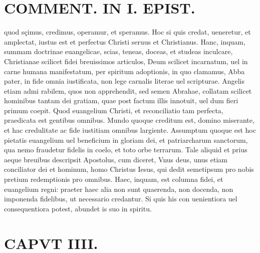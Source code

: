 \documentclass{article}
\begin{document}
\begin{pages}
\section*{COMMENT. IN I. EPIST. }
\marginpar{[ p.504 ]}\pstart quod sçimus, credimus, operamur, et speramus. Hoc si quis credat, ueneretur, et amplectat, iustus est et perfectus Christi seruus et Christianus. Hanc, inquam, summam doctrinae euangelicae, scias, teneas, doceas, et studeas inculcare, Christianae scilicet fidei breuissimos articulos, Deum scilicet incarnatum, uel in carne humana manifestatum, per spiritum adoptionis, in quo clamamus, Abba pater, in fide omnia iustificata, non lege carnalis literae uel scripturae. Angelis etiam admi rabilem, quos non apprehendit, sed semen Abrahae, collatam scilicet hominibus tantam dei gratiam, quae post factum illis innotuit, uel dum fieri primum coepit. Quod euangelium Christi, et reconciliatio tam perfecta, praedicata est gentibus omnibus. Mundo quoque creditum est, domino miserante, et hac credulitate ac fide iustitiam omnibus largiente. Assumptum quoque est hoc pietatis euangelium uel beneficium in gloriam dei, et patriarcharum sanctorum, qua nemo fraudetur fidelis in coelo, et toto orbe terrarum. Tale aliquid et prius aeque breuibus descripsit Apostolus, cum diceret, Vnus deus, unus etiam conciliator dei et hominum, homo Christus Iesus, qui dedit semetipsum pro nobis pretium redemptionis pro omnibus. Haec, inquam, est columna fidei, et euangelium regni: praeter haec alia non sunt quaerenda, non docenda, non imponenda fidelibus, ut necessario credantur. Si quis his con uenientiora uel consequentiora potest, abundet is suo in spiritu.  \pend
\endnumbering\beginnumbering\section{CAPVT IIII.}
{}

\end{pages}
\end{document}
